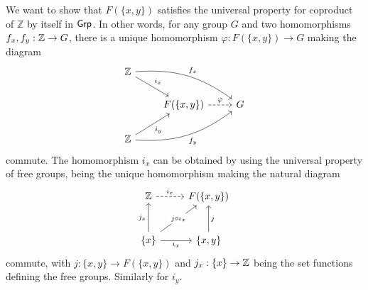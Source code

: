 \begin{solution}
	We want to show that $F(\{x, y\})$ satisfies the universal property for coproduct of $\mathbb{Z}$ by itself in $\mathsf{Grp}$. In other words, for any group $G$ and two homomorphisms $f_x, f_y: \mathbb{Z} \to G$, there is a unique homomorphism $\varphi: F(\{x, y\}) \to G$ making the diagram
	\begin{equation*}
		\begin{tikzcd}
			\Zs
			\arrow[dr, "i_x"]
			\arrow[drr, bend left=20, "f_x"]
			& & \\
			& F(\{x, y\})
			\arrow[r, dashrightarrow, "\varphi"]
			& G \\
			\Zs
			\arrow[ur, "i_y"']
			\arrow[urr, bend right=20, "f_y"']
			& &
		\end{tikzcd}
	\end{equation*}
	commute. The homomorphism $i_x$ can be obtained by using the universal property of free groups, being the unique homomorphism making the natural diagram
	\begin{equation*}
		\begin{tikzcd}[row sep=large]
			\Zs
			\arrow[r, dashrightarrow, "i_x"]
			& F(\{x, y\}) \\
			\{x\}
			\arrow[u, "j_x"]
			\arrow[r, "\iota_x"']
			\arrow[ur, "j \circ \iota_x" description]
			& \{x ,y\}
			\arrow[u, "j"']
		\end{tikzcd}
	\end{equation*}
	commute, with $j: \{x ,y\} \to F(\{x ,y\})$ and $j_x: \{x\} \to \mathbb{Z}$ being the set functions defining the free groups. Similarly for $i_y$. 
	

\end{solution}
